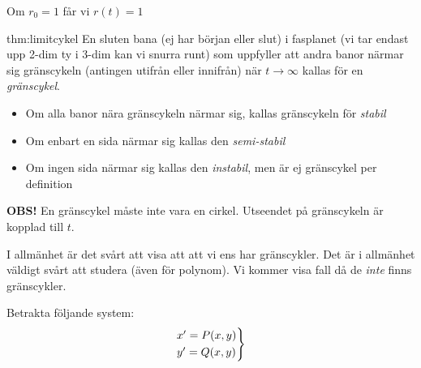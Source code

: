 \par\bigskip
\noindent Om $r_0=1$ får vi $r(t) = 1$
\par\bigskip
\begin{theo}[Gränscykel]{thm:limitcykel}
  En sluten bana (ej har början eller slut) i fasplanet (vi tar endast upp 2-dim ty i 3-dim kan vi snurra runt) som uppfyller att andra banor närmar sig gränscykeln (antingen utifrån eller innifrån) när $t\to\infty$ kallas för en \textit{gränscykel}. \par
  \begin{itemize}
    \item Om alla banor nära gränscykeln närmar sig, kallas gränscykeln för \textit{stabil}
    \item Om enbart en sida närmar sig kallas den \textit{semi-stabil}
    \item Om ingen sida närmar sig kallas den \textit{instabil}, men är ej gränscykel per definition
  \end{itemize}\par\bigskip
  \noindent\textbf{OBS!} En gränscykel måste inte vara en cirkel. Utseendet på gränscykeln är kopplad till $t$. 
\end{theo}
\par\bigskip
\noindent I allmänhet är det svårt att visa att att vi ens har gränscykler. Det är i allmänhet väldigt svårt att studera (även för polynom). Vi kommer visa fall då de \textit{inte} finns gränscykler.
\par\bigskip
\noindent Betrakta följande system:
\begin{equation*}
  \begin{gathered}
    \begin{rcases*}
      x^{\prime} = P(x,y)\\
      y^{\prime} = Q(x,y)
    \end{rcases*}
  \end{gathered}
\end{equation*}
\par\bigskip

